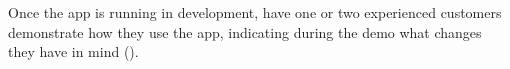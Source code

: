 Once the app is running in development, have one or two experienced
customers demonstrate how they use the app, indicating during the demo
what changes they have in mind (\cite{nierstrasz:reengineering}).
